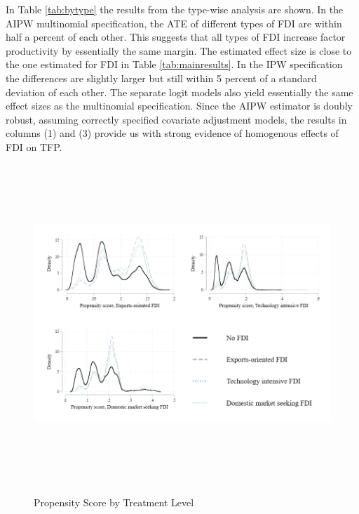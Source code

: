 \documentclass[a4paper,11pt]{scrartcl}
\begin{document}
In Table \ref{tab:bytype} the results from the type-wise analysis are shown. In the AIPW multinomial specification, the ATE of different types of FDI are within half a percent of each other. This suggests that all types of FDI increase factor productivity by essentially the same margin. The estimated effect size is close to the one estimated for FDI in Table \ref{tab:mainresults}. In the IPW specification the differences are slightly larger but still within 5 percent of a standard deviation of each other.  The separate logit models also yield essentially the same effect sizes as the multinomial specification. Since the AIPW estimator is doubly robust, assuming correctly specified covariate adjustment models, the results in columns (1) and (3) provide us with strong evidence of homogenous effects of FDI on TFP.


\begin{figure}[h]
	
	\caption{Propensity Score by Treatment Level}
\hspace*{-2cm}  	
	\includegraphics[height=12cm]{overlap_type.png}\\ 
	\label{fig:over_typ}
 
\end{figure}
\end{document}
